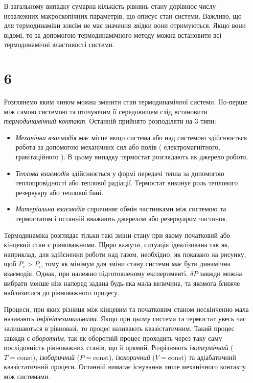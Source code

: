 В загальному випадку сумарна кількість рівнянь стану дорівнює числу незалежних макроскопічних параметрів, що описує стан системи. Важливо, що для термодинаміки зовсім не має значення звідки вони отримуються. Якщо вони відомі, то за допомогою термодинамічного методу можна встановити всі термодинамічні властивості системи.



\section{6}




Розглянемо яким чином можна змінити стан термодинамічної системи. По-перше між самою системою та оточуючим її середовищем слід встановити \emph{термодинамічний контакт}. Останній прийнято розподіляти на $3$ типи:

\begin{itemize}
    \item \emph{Механічна взаємодія} має місце якщо система або над системою здійснюється робота за допомогою механічних сил або полів ( електромагнітного, гравітаційного ). В цьому випадку термостат розглядають як джерело роботи.

    \item \emph{Теплова взаємодія} здійснюється у формі передачі тепла за допомогою теплопровідності або теплової радіації. Термостат виконує роль теплового резервуару або теплової бані.

    \item \emph{Матеріальна взаємодія} спричиняє обмін частинками між системою та термостатом і останній вважають джерелом або резервуаром частинок.
\end{itemize}

Термодинаміка розглядає тільки такі зміни стану при якому початковий або кінцевий стан є рівноважними. Щиро кажучи, ситуація ідеалізована так як, наприклад, для здійснення роботи над газом, необхідно, як показано на рисунку, щоб $P_e > P_i$, тому як мінімум для зміни стану системи має бути динамічна взаємодія. Однак, при належно підготовленому експерименті, $\delta P$ завжди можна вибрати менше ніж наперед задана будь-яка мала величина, та якомога ближче наблизитися  до рівноважного процесу.

Процеси, при яких різниця між кінцевим та початковим станом нескінченно мала називають \emph{інфінітезимальними}. Якщо при цьому система та термостат увесь час залишаються в рівновазі, то процес називають квазістатичним. Такий процес завжди є \emph{оборотнім}, так як оборотній процес проходить через таку саму послідовність рівноважних станів, що й прямий. Розрізняють \emph{ізотермічний} ($T = \mathrm{const}$), \emph{ізобаричний} ($P = \mathrm{const}$),  \emph{ізохоричний} ($V = \mathrm{const}$) та адіабатичний квазістатичний процеси. Останній вимагає існування лише механічного контакту між системами.


